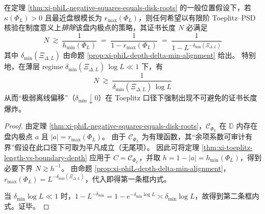 \begin{corollary}\label{cor:xi-phiL-toeplitz-length-lb-delta-min}
在定理 \ref{thm:xi-phiL-negative-squares-equals-disk-roots} 的一般位置假设下，若 \(\kappa(\Phi_L)>0\) 且最近盘根模长为 \(r_{\max}(\Phi_L)\)，则任何希望以有限阶 Toeplitz--PSD 核验在制度意义上\emph{排除}该盘内极点的策略，其证书长度 \(N\) 必满足
\[
\boxed{\;
N\ \gtrsim\ \frac{1}{h_{\min}(\Phi_L)}
\;=\;\frac{1}{1-r_{\max}(\Phi_L)}
\;=\;\frac{1}{1-L^{-\delta_{\min}(\Xi_{\Delta,L})}}\;}
\]
其中 \(\delta_{\min}(\Xi_{\Delta,L})\) 由命题 \ref{prop:xi-phiL-depth-delta-min-alignment} 给出。
特别地，在薄层 regime \(\delta_{\min}(\Xi_{\Delta,L})\,\log L\ll 1\) 下，有
\[
\boxed{\;
N\ \gtrsim\ \frac{1}{\delta_{\min}(\Xi_{\Delta,L})\,\log L}\;}
\]
从而“极弱离线偏移”（\(\delta_{\min}\downarrow 0\)）在 Toeplitz 口径下强制出现不可避免的证书长度爆炸。
\end{corollary}

\begin{proof}
由定理 \ref{thm:xi-phiL-negative-squares-equals-disk-roots}，\(\mathscr{C}_{\Phi_L}\) 在 \(\mathbb{D}\) 内存在盘内极点 \(a\) 且 \(|a|=r_{\max}(\Phi_L)\)。
由于 \(\mathscr{C}_{\Phi_L}\) 为有理函数，其“余项系数可审计有界”假设在此口径下可取为平凡成立（无尾项）。
因此可将定理 \ref{thm:xi-toeplitz-length-vs-boundary-depth} 应用于 \(C=\mathscr{C}_{\Phi_L}\)，并取 \(h=1-|a|=h_{\min}(\Phi_L)\)，得到必要下界 \(N\gtrsim h^{-1}\)。
由命题 \ref{prop:xi-phiL-depth-delta-min-alignment}，\(r_{\max}(\Phi_L)=L^{-\delta_{\min}(\Xi_{\Delta,L})}\)，代入即得第一条框内式。
\par
当 \(\delta_{\min}\log L\ll 1\) 时，\(1-L^{-\delta_{\min}}=1-e^{-\delta_{\min}\log L}\asymp \delta_{\min}\log L\)，故得到第二条框内式。证毕。
\end{proof}


